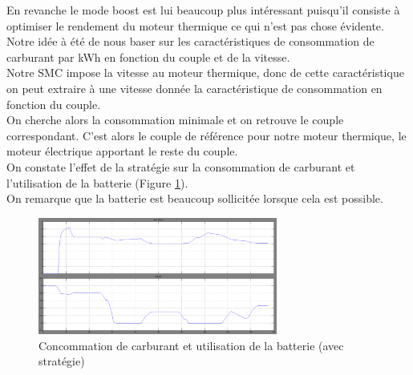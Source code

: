 En revanche le mode boost est lui beaucoup plus intéressant puisqu'il consiste à optimiser le rendement du moteur thermique ce qui n'est pas chose évidente.\\
Notre idée à été de nous baser sur les caractéristiques de consommation de carburant par kWh en fonction du couple et de la vitesse.\\
Notre SMC impose la vitesse au moteur thermique, donc de cette caractéristique on peut extraire à une vitesse donnée la caractéristique de consommation en fonction du couple.\\
On cherche alors la consommation minimale et on retrouve le couple correspondant. C'est alors le couple de référence pour notre moteur thermique, le moteur électrique apportant le reste du couple.\\

On constate l'effet de la stratégie sur la consommation de carburant et l'utilisation de la batterie (Figure \ref{img:liter_optimisation}).\\ On remarque que la batterie est beaucoup sollicitée lorsque cela est possible.\\

\begin{figure}[ht]
\begin{center}
	\includegraphics[width=0.7\textwidth]{images/liter_optimisation}
	\caption{Concommation de carburant et utilisation de la batterie (avec stratégie)}\label{img:liter_optimisation}
\end{center}
\end{figure}
\FloatBarrier